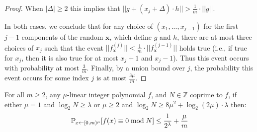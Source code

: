 \begin{proof}
When $|\Delta| \geq 2$ this implies that $||g + (x_j + \Delta) \cdot h|| > \frac{1}{m} \cdot ||g||$.  

In both cases, we conclude that for any choice of $(x_1,...,x_{j-1})$ for the first $j-1$ components of the random $\mathbf{x}$, which define $g$ and $h$, there are at most three choices of $x_j$ such that the event $||f_{\mathbf{x}}^{(j)}|| < \frac{1}{m} \cdot ||f_{\mathbf{x}}^{(j-1)}||$ holds true  (i.e., if true for $x_j$, then it is also true for at most $x_j + 1$ and $x_j - 1$). Thus this event occurs with probability at most $\frac{3}{m}$. Finally, by a union bound over $j$, the probability this event occurs for some index $j$ is at most $\frac{3\mu}{m}$. 


 \end{proof}

 
 \begin{lemma}\label{lem:CSZ}
 For all $m \geq 2$, any $\mu$-linear integer polynomial $f$, and $N \in \mathbb{Z}$ coprime to $f$, if either $\mu = 1$ and $ \log_2 N \geq \lambda$ or $\mu \geq 2$ and $\log_2 N\geq 8 \mu^2 + \log_2(2\mu)\cdot \lambda$ then:
 $$\mathbb{P}_{x\gets [0,m)^\mu} [f(x)\equiv 0 \bmod N]\leq \frac{1}{2^{\lambda}} + \frac{\mu}{m}$$
 \end{lemma} 
 
